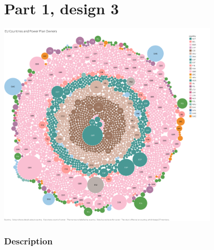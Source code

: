 \hypertarget{part-1-design-3}{%
\section{Part 1, design 3}\label{part-1-design-3}}

\centering
\includegraphics[height=10cm]{Viz3.png}

\hypertarget{description}{%
\subsubsection{Description}\label{description}}

